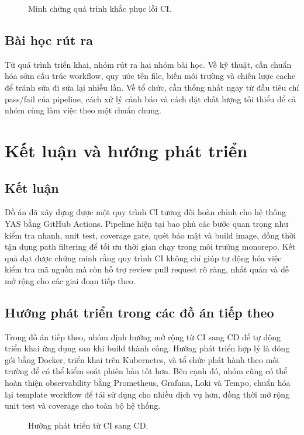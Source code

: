 \begin{figure}[H]
	\centering
	\caption{Minh chứng quá trình khắc phục lỗi CI.}
\end{figure}

\subsection{Bài học rút ra}
Từ quá trình triển khai, nhóm rút ra hai nhóm bài học. Về kỹ thuật, cần chuẩn hóa sớm cấu trúc workflow, quy ước tên file, biến môi trường và chiến lược cache để tránh sửa đi sửa lại nhiều lần. Về tổ chức, cần thống nhất ngay từ đầu tiêu chí pass/fail của pipeline, cách xử lý cảnh báo và cách đặt chất lượng tối thiểu để cả nhóm cùng làm việc theo một chuẩn chung.

\section{Kết luận và hướng phát triển}

\subsection{Kết luận}
Đồ án đã xây dựng được một quy trình CI tương đối hoàn chỉnh cho hệ thống YAS bằng GitHub Actions. Pipeline hiện tại bao phủ các bước quan trọng như kiểm tra nhanh, unit test, coverage gate, quét bảo mật và build image, đồng thời tận dụng path filtering để tối ưu thời gian chạy trong môi trường monorepo. Kết quả đạt được chứng minh rằng quy trình CI không chỉ giúp tự động hóa việc kiểm tra mã nguồn mà còn hỗ trợ review pull request rõ ràng, nhất quán và dễ mở rộng cho các giai đoạn tiếp theo.

\subsection{Hướng phát triển trong các đồ án tiếp theo}
Trong đồ án tiếp theo, nhóm định hướng mở rộng từ CI sang CD để tự động triển khai ứng dụng sau khi build thành công. Hướng phát triển hợp lý là đóng gói bằng Docker, triển khai trên Kubernetes, và tổ chức phát hành theo môi trường để có thể kiểm soát phiên bản tốt hơn. Bên cạnh đó, nhóm cũng có thể hoàn thiện observability bằng Prometheus, Grafana, Loki và Tempo, chuẩn hóa lại template workflow để tái sử dụng cho nhiều dịch vụ hơn, đồng thời mở rộng unit test và coverage cho toàn bộ hệ thống.

\begin{figure}[H]
	\centering
	\caption{Hướng phát triển từ CI sang CD.}
\end{figure}